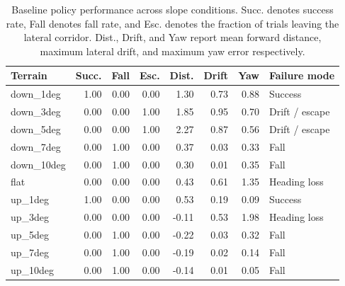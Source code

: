 \begin{table}[h]
\centering
\small
\begin{tabular}{lrrrrrrl}
\hline
Terrain & Succ. & Fall & Esc. & Dist. & Drift & Yaw & Failure mode \\
\hline
down_1deg & 1.00 & 0.00 & 0.00 & 1.30 & 0.73 & 0.88 & Success \\
down_3deg & 0.00 & 0.00 & 1.00 & 1.85 & 0.95 & 0.70 & Drift / escape \\
down_5deg & 0.00 & 0.00 & 1.00 & 2.27 & 0.87 & 0.56 & Drift / escape \\
down_7deg & 0.00 & 1.00 & 0.00 & 0.37 & 0.03 & 0.33 & Fall \\
down_10deg & 0.00 & 1.00 & 0.00 & 0.30 & 0.01 & 0.35 & Fall \\
flat & 0.00 & 0.00 & 0.00 & 0.43 & 0.61 & 1.35 & Heading loss \\
up_1deg & 1.00 & 0.00 & 0.00 & 0.53 & 0.19 & 0.09 & Success \\
up_3deg & 0.00 & 0.00 & 0.00 & -0.11 & 0.53 & 1.98 & Heading loss \\
up_5deg & 0.00 & 1.00 & 0.00 & -0.22 & 0.03 & 0.32 & Fall \\
up_7deg & 0.00 & 1.00 & 0.00 & -0.19 & 0.02 & 0.14 & Fall \\
up_10deg & 0.00 & 1.00 & 0.00 & -0.14 & 0.01 & 0.05 & Fall \\
\hline
\end{tabular}
\caption{Baseline policy performance across slope conditions. Succ. denotes success rate, Fall denotes fall rate, and Esc. denotes the fraction of trials leaving the lateral corridor. Dist., Drift, and Yaw report mean forward distance, maximum lateral drift, and maximum yaw error respectively.}
\label{tab:baseline_slope_results}
\end{table}
